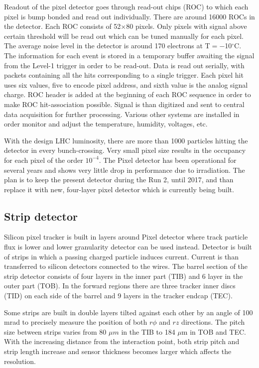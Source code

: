 \par Readout of the pixel detector goes through read-out chips (ROC) to which each pixel is bump bonded and read out individually. There are around 16000 ROCs in the detector. Each ROC consists of 52$\times$80 pixels. Only pixels with signal above certain threshold will be read out which can be tuned manually for each pixel. The average noise level in the detector is around 170 electrons at T$=-$10$^\circ$C. The information for each event is stored in a temporary buffer awaiting the signal from the Level-1 trigger in order to be read-out. Data is read out serially, with packets containing all the hits corresponding to a single trigger. Each pixel hit uses six values, five to encode pixel address, and sixth value is the analog signal charge. ROC header is added at the beginning of each ROC sequence in order to make ROC hit-association possible. Signal is than digitized and sent to central data acquisition for further processing. Various other systems are installed in order monitor and adjust the temperature, humidity, voltages, etc. 
\par With the design LHC luminosity, there are more than 1000 particles hitting the detector in every bunch-crossing. Very small pixel size results in the occupancy for each pixel of the order $10^{-4}$. The Pixel detector has been operational for several years and shows very little drop in performance due to irradiation. The plan is to keep the present detector during the Run 2, until 2017, and than replace it with new, four-layer pixel detector which is currently being built.


\subsection{Strip detector}

Silicon pixel tracker is built in layers around Pixel detector where track particle flux is lower and lower granularity detector can be used instead. Detector is built of strips in which a passing charged particle induces current. Current is than transferred to silicon detectors connected to the wires. The barrel section of the strip detector consists of four layers in the inner part (TIB) and 6 layer in the outer part (TOB). In the forward regions there are three tracker inner discs (TID) on each side of the barrel and 9 layers in the tracker endcap (TEC). 
\par Some strips are built in double layers tilted against each other by an angle of 100 mrad to precisely measure the position of both $r\phi$ and $rz$ directions. The pitch size between strips varies from 80 $\mu m$ in the TIB to 184 $\mu$m in TOB and TEC. With the increasing distance from the interaction point, both strip pitch and strip length increase and sensor thickness becomes larger which affects the resolution.    

